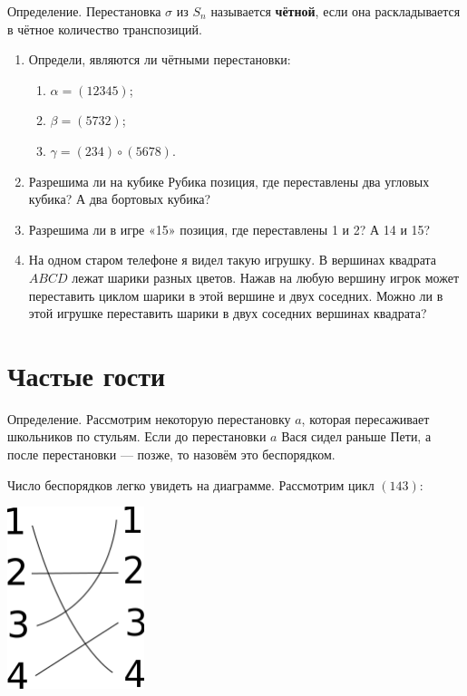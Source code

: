 \documentclass[12pt]{article} %
\begin{document}
Определение. Перестановка $\sigma$ из $S_n$ называется \textbf{чётной}, если она раскладывается в чётное количество транспозиций.

\begin{enumerate}[resume]
  \item Определи, являются ли чётными перестановки:
  \begin{enumerate}
    \item $\alpha = (12345)$;
    \item $\beta = (5732)$;
    \item $\gamma = (234)\circ(5678)$.
  \end{enumerate}

  \item Разрешима ли на кубике Рубика позиция, где переставлены два угловых кубика? А два бортовых кубика?
  \item Разрешима ли в игре «15» позиция, где переставлены 1 и 2? А 14 и 15?
  \item На одном старом телефоне я видел такую игрушку. В вершинах квадрата $ABCD$ лежат шарики разных цветов. Нажав на любую вершину игрок может переставить циклом шарики в этой вершине и двух соседних. Можно ли в этой игрушке переставить шарики в двух соседних вершинах квадрата?
\end{enumerate}


\newpage
\section{Частые гости}

Определение. Рассмотрим некоторую перестановку $a$, которая пересаживает школьников по стульям. Если до перестановки $a$ Вася сидел раньше Пети, а после перестановки — позже, то назовём это беспорядком.

Число беспорядков легко увидеть на диаграмме. Рассмотрим цикл $(143)$:

\begin{minipage}[c]{0.5\textwidth}
  \centering
          \includegraphics[width=4cm]{figure/swap_number.png}
  \end{minipage}
\end{document}
